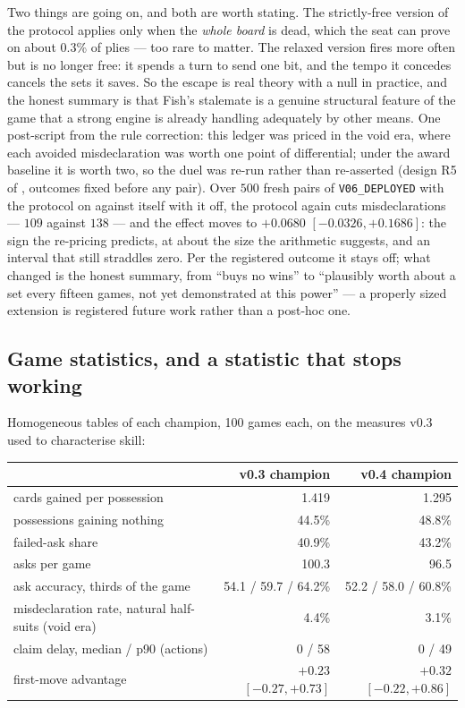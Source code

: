 \documentclass[11pt,a4paper]{article}
\begin{document}
Two things are going on, and both are worth stating. The strictly-free version
of the protocol applies only when the \emph{whole board} is dead, which the seat
can prove on about 0.3\% of plies --- too rare to matter. The relaxed version
fires more often but is no longer free: it spends a turn to send one bit, and
the tempo it concedes cancels the sets it saves. So the escape is real theory
with a null in practice, and the honest summary is that Fish's stalemate is a
genuine structural feature of the game that a strong engine is already handling
adequately by other means. One post-script from the rule correction: this
ledger was priced in the void era, where each avoided misdeclaration was
worth one point of differential; under the award baseline it is worth two,
so the duel was re-run rather than re-asserted (design R5 of
, outcomes fixed before any pair).
Over $500$ fresh pairs of \texttt{V06\_DEPLOYED} with the protocol on
against itself with it off, the protocol again cuts misdeclarations ---
$109$ against $138$ --- and the effect moves to $+0.0680$
$[-0.0326, +0.1686]$: the sign the re-pricing predicts, at about the size
the arithmetic suggests, and an interval that still straddles zero. Per
the registered outcome it stays off; what changed is the honest summary,
from ``buys no wins'' to ``plausibly worth about a set every fifteen
games, not yet demonstrated at this power'' --- a properly sized
extension is registered future work rather than a post-hoc one.

\subsection{Game statistics, and a statistic that stops working}
\label{sec:res-analytics}

Homogeneous tables of each champion, 100 games each, on the measures v0.3 used
to characterise skill:

\begin{center}
\small
\begin{tabular}{lrr}
\toprule
& v0.3 champion & v0.4 champion \\
\midrule
cards gained per possession & 1.419 & 1.295 \\
possessions gaining nothing & 44.5\% & 48.8\% \\
failed-ask share & 40.9\% & 43.2\% \\
asks per game & 100.3 & 96.5 \\
ask accuracy, thirds of the game & 54.1 / 59.7 / 64.2\% & 52.2 / 58.0 / 60.8\% \\
misdeclaration rate, natural half-suits (void era) & 4.4\% & 3.1\% \\
claim delay, median / p90 (actions) & 0 / 58 & 0 / 49 \\
first-move advantage & $+0.23$ $[-0.27, +0.73]$ & $+0.32$ $[-0.22, +0.86]$ \\
\bottomrule
\end{tabular}
\end{center}
\end{document}
